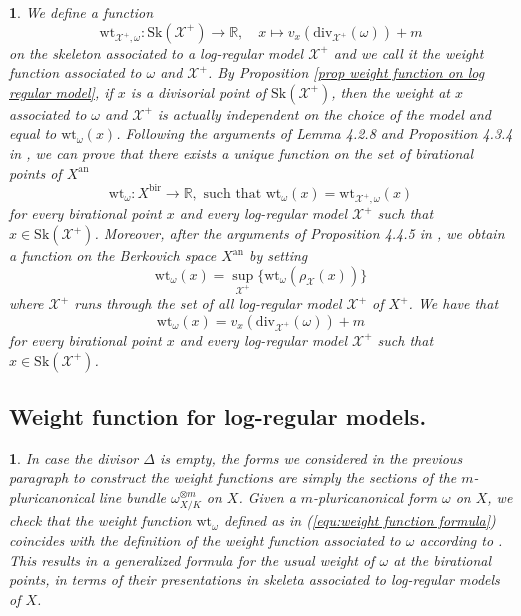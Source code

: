 \documentclass{amsart}%
\numberwithin{equation}{subsection}
\theoremstyle{plain2}
\theoremstyle{definition2}
\theoremstyle{stepstyle}
\theoremstyle{point}
\theoremstyle{subpoint}
\newtheorem{subpoint}[equation]{}%
\newcommand{\spa}[1]{\begin{subpoint}#1\end{subpoint}}           %
\newcommand{\R}{\ensuremath{\mathbb{R}}}
\newcommand{\cX}{\ensuremath{\mathscr{X}}}
\newcommand{\cY}{\ensuremath{\mathscr{Y}}}
\renewcommand{\R}{\ensuremath{\mathbb{R}}}
\renewcommand{\cY}{\ensuremath{\mathscr{Y}}}
\newcommand{\an}{\mathrm{an}}
\newcommand{\divisor}{\mathrm{div}}
\newcommand{\weight}{\mathrm{wt}}
\newcommand{\Sk}{\mathrm{Sk}}
\begin{document}
\spa{We define a function $$\weight_{\cX^+,\omega}: \Sk(\cX^+) \rightarrow \R, \quad x \mapsto v_x(\divisor_{\cX^+}(\omega)) +m$$ on the skeleton associated to a log-regular model $\cX^+$ and we call it the weight function associated to $\omega$ and $\cX^+$. By Proposition \ref{prop weight function on log regular model}, if $x$ is a divisorial point of $\Sk(\cX^+)$, then the weight at $x$ associated to $\omega$ and $\cX^+$ is actually independent on the choice of the model and equal to $\weight_{\omega}(x)$. Following the arguments of Lemma 4.2.8 and Proposition 4.3.4 in \cite{MustataNicaise}, we can prove that there exists a unique function on the set of birational points of $X^\an$ $$\weight_{\omega}: X^{\text{bir}} \rightarrow \R, \text{ such that }\weight_{\omega}(x)= \weight_{\cX^+,\omega}(x)$$ for every birational point $x$ and every log-regular model $\cX^+$ such that $x \in \Sk(\cX^+)$. Moreover, after the arguments of Proposition 4.4.5 in \cite{MustataNicaise}, we obtain a function on the Berkovich space $X^\an$ by setting $$\weight_{\omega}(x) = \sup_{\cX^+} \{ \weight_{\omega}(\rho_\cX (x))\}$$ where $\cX^+$ runs through the set of all log-regular model $\cX^+$ of $X^+$. We have that \begin{equation} \label{equ:weight function formula} \weight_{\omega}(x)=v_x(\divisor_{\cX^+}(\omega)) +m
\end{equation}for every birational point $x$ and every log-regular model $\cX^+$ such that $x \in \Sk(\cX^+)$.}

\subsection{Weight function for log-regular models.}
\spa{In case the divisor $\Delta$ is empty, the forms we considered in the previous paragraph to construct the weight functions are simply the sections of the $m$-pluricanonical line bundle $\omega_{X/K}^{\otimes m}$ on $X$. Given a $m$-pluricanonical form $\omega$ on $X$, we check that the weight function $\weight_{\omega}$ defined as in (\ref{equ:weight function formula}) coincides with the definition of the weight function associated to $\omega$ according to \cite{MustataNicaise}. This results in a generalized formula for the usual weight of $\omega$ at the birational points, in terms of their presentations in skeleta associated to log-regular models of $X$.}
\end{document}
